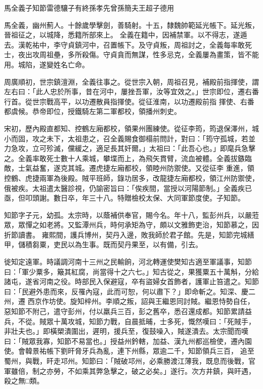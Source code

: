 
\begin{pinyinscope}

 馬全義子知節雷德驤子有終孫孝先曾孫簡夫王超子德用



 馬全義，幽州薊人。十餘歲學擊劍，善騎射。十五，隸魏帥範延光帳下。延光叛，晉祖征之，以城降，悉籍所部來上。
 全義在籍中，因補禁軍。以不得志，遂遁去。漢乾祐中，李守貞鎮河中，召置帳下。及守貞叛，周祖討之，全義每率敢死士，夜出攻周祖壘，多所殺傷。守貞貪而無謀，性多忌克，全義屢為畫策，皆不能用。城陷，遂變姓名亡命。



 周廣順初，世宗鎮澶淵，全義往事之。從世宗入朝，周祖召見，補殿前指揮使，謂左右曰：「此人忠於所事，昔在河中，屢挫吾軍，汝等宜效之。」世宗即位，遷右番行首。從世宗戰高平，以功遷散員指揮使。從征淮南，以功遷殿前指
 揮使、右番都虞候。恭帝即位，授鐵騎左第二軍都校，領播州刺史。



 宋初，歷內殿直都知、控鶴左廂都校，領果州團練使。從征李筠，筠退保澤州，城小而固，攻之未下，太祖患之，召全義賜食御榻前問計，對曰：「筠守孤城，若並力急攻，立可殄滅，儻緩之，適足長其奸爾。」太祖曰：「此吾心也。」即麾兵急擊之。全義率敢死士數十人乘城，攀堞而上，為飛矢貫臂，流血被體。全義拔鏃臨敵，士氣益奮，遂克其城。遷虎捷左廂都校，領睦州防禦使。又從征李
 重進，領控鶴、虎捷兩軍為後殿。賊平班師，錄功居多，改龍捷左廂都校，領江州防禦使，俄被疾。太祖遣太醫診視，仍諭密旨曰：「俟疾間，當授以河陽節制。」全義疾已亟，但叩頭謝。數日卒，年三十八。特贈檢校太保、大同軍節度使。子知節。



 知節字子元，幼孤。太宗時，以蔭補供奉官，賜今名。年十八，監彭州兵，以嚴蒞眾，眾憚之如老將。又監潭州兵，時何承矩為守，頗以文雅飾吏治，知節慕之，因折節讀書。
 雍熙間，護兵博州，契丹入邊，敗我師於君子館。先是，知節完城繕甲，儲積芻粟，吏民以為生事。既而契丹果至，以有備，引去。



 徙知定遠軍。時議調河南十三州之民輸餉，河北轉運使樊知古適至軍議事，知節曰：「軍少粟多，簸其紅腐，尚當得十之六七。」知古從之，果獲粟五十萬斛，分給諸屯，遂省河南之役。時部民入保避寇，卒有盜婦女首飾者，護軍止笞遣之。知節曰：「民避外患而來，反罹內寇，此而可恕，何以肅下？」即命斬之。知深、慶二州，遷
 西京作坊使。旋知梓州。李順之叛，詔與王繼恩同討賊。繼恩恃勢自任，惡知節不附己，遣守彭州，付以羸兵三百，彭之舊卒，悉召還成都。知節累請益兵，不從。賊眾十萬攻城，知節力戰，自晨抵晡，士多死，慨然嘆曰：「死賊手，非壯夫也。」即橫槊潰圍出，遲明，援兵至，復鼓噪入，賊遂潰去。太宗聞而嘆曰：「賊眾我寡，知節不易當也。」授益州鈐轄，加益、漢九州都巡檢使，遷內園使。會韓景祐帳下劉旰脅牙兵為亂，連下州縣，眾逾二千，知節領兵三百，
 追至蜀州，與戰，旰走邛州。知節曰：「賊破邛州，必乘勝渡江薄我，既息而後戰，官軍雖倍，制之亦勞，不如乘其弊急擊之，破之必矣。」遂行。次方井鎮，與旰遇，殺之無□類。




\end{pinyinscope}
